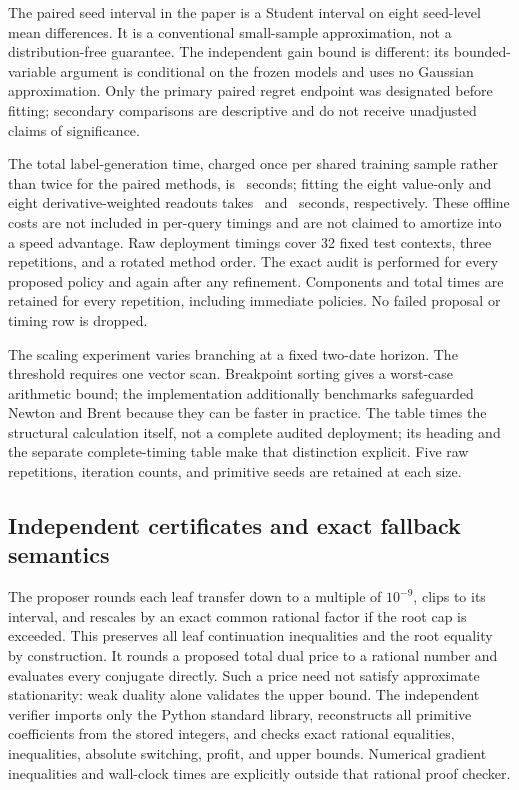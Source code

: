 The paired seed interval in the paper is a Student interval on eight seed-level mean differences. It is a conventional small-sample approximation, not a distribution-free guarantee. The independent gain bound is different: its bounded-variable argument is conditional on the frozen models and uses no Gaussian approximation. Only the primary paired regret endpoint was designated before fitting; secondary comparisons are descriptive and do not receive unadjusted claims of significance.

The total label-generation time, charged once per shared training sample rather than twice for the paired methods, is \RFourteenLabelTime\ seconds; fitting the eight value-only and eight derivative-weighted readouts takes \RFourteenValueFit\ and \RFourteenGradientFit\ seconds, respectively. These offline costs are not included in per-query timings and are not claimed to amortize into a speed advantage. Raw deployment timings cover 32 fixed test contexts, three repetitions, and a rotated method order. The exact audit is performed for every proposed policy and again after any refinement. Components and total times are retained for every repetition, including immediate policies. No failed proposal or timing row is dropped.


The scaling experiment varies branching at a fixed two-date horizon. The threshold requires one vector scan. Breakpoint sorting gives a worst-case arithmetic bound; the implementation additionally benchmarks safeguarded Newton and Brent because they can be faster in practice. The table times the structural calculation itself, not a complete audited deployment; its heading and the separate complete-timing table make that distinction explicit. Five raw repetitions, iteration counts, and primitive seeds are retained at each size.


\subsection{Independent certificates and exact fallback semantics}
The proposer rounds each leaf transfer down to a multiple of $10^{-9}$, clips to its interval, and rescales by an exact common rational factor if the root cap is exceeded. This preserves all leaf continuation inequalities and the root equality by construction. It rounds a proposed total dual price to a rational number and evaluates every conjugate directly. Such a price need not satisfy approximate stationarity: weak duality alone validates the upper bound. The independent verifier imports only the Python standard library, reconstructs all primitive coefficients from the stored integers, and checks exact rational equalities, inequalities, absolute switching, profit, and upper bounds. Numerical gradient inequalities and wall-clock times are explicitly outside that rational proof checker.

